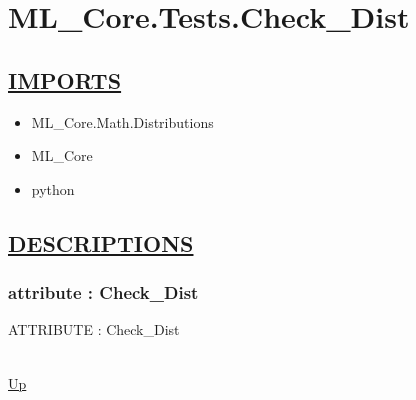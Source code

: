\chapter*{ML\_Core.Tests.Check\_Dist}
\hypertarget{ML_Core.Tests.Check_Dist}{}

\section*{\underline{IMPORTS}}
\begin{itemize}
\item ML\_Core.Math.Distributions
\item ML\_Core
\item python
\end{itemize}

\section*{\underline{DESCRIPTIONS}}
\subsection*{attribute : Check\_Dist}
\hypertarget{ecldoc:ml_core.tests.check_dist}{ATTRIBUTE : Check\_Dist} \\
\hyperlink{ecldoc:}{Up} \\
\par

